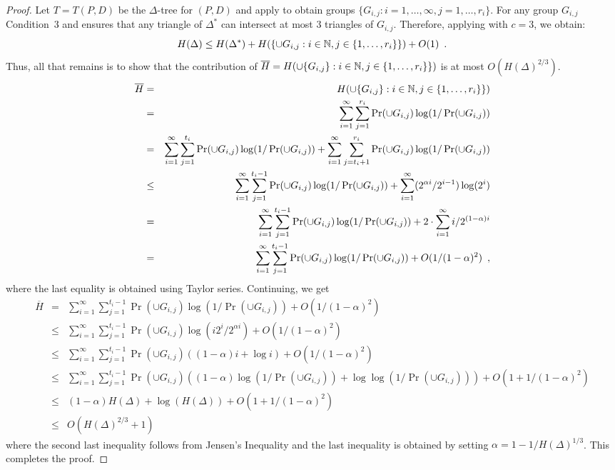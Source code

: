 \documentclass[lotsofwhite]{patmorin}
\begin{document}
\begin{proof}
Let $T=T(P,D)$ be the $\Delta$-tree for $(P,D)$ and apply
 to obtain groups $\{G_{i,j}: i=1,\ldots,\infty,
j=1,\ldots,r_i\}$.  For any group $G_{i,j}$ Condition~3 and
 ensures that any triangle of
$\Delta^*$ can intersect at most 3 triangles of $G_{i,j}$.  Therefore,
applying  with $c=3$, we obtain:
\[ 
 H(\Delta) \le 
   H(\Delta^*) + H(\{{\cup G_{i,j}} : i\in\mathbb{N} , j\in\{1,\ldots,r_i\}\}) 
   + O(1)  \enspace .
\]
Thus, all that remains is to show that the contribution of $\overline
H=H(\cup\{G_{i,j}\} : i\in\mathbb{N} , j\in\{1,\ldots,r_i\}\})$ is at most
$O(H(\Delta)^{2/3})$. 
\begin{eqnarray*}
\overline H 
 & = & H(\cup\{G_{i,j}\} : i\in\mathbb{N} , j\in\{1,\ldots,r_i\}\}) \\
 & = & \sum_{i=1}^\infty
         \sum_{j=1}^{r_i}\Pr(\cup G_{i,j})\log(1/\Pr(\cup G_{i,j})) \\
 & = & \sum_{i=1}^\infty
         \sum_{j=1}^{t_i}\Pr(\cup G_{i,j})\log(1/\Pr(\cup G_{i,j})) 
         + \sum_{i=1}^\infty
         \sum_{j=t_i+1}^{r_i}\Pr(\cup G_{i,j})\log(1/\Pr(\cup G_{i,j})) \\
 & \le & \sum_{i=1}^\infty
         \sum_{j=1}^{t_i-1}\Pr(\cup G_{i,j})\log(1/\Pr(\cup G_{i,j})) 
         + \sum_{i=1}^{\infty} (2^{\alpha i}/ 2^{i-1})\log(2^i) \\
 &  =  & \sum_{i=1}^\infty
         \sum_{j=1}^{t_i-1}\Pr(\cup G_{i,j})\log(1/\Pr(\cup G_{i,j})) 
         + 2\cdot\sum_{i=1}^{\infty} i/2^{(1-\alpha)i} \\
 &  =  & \sum_{i=1}^\infty
         \sum_{j=1}^{t_i-1}\Pr(\cup G_{i,j})\log(1/\Pr(\cup G_{i,j}))
         + O(1/(1-\alpha)^2) \enspace ,
\end{eqnarray*}
where the last equality is obtained using Taylor series.
Continuing, we get 
\begin{eqnarray*}
\overline H
 &  =  & \sum_{i=1}^\infty
         \sum_{j=1}^{t_i-1}\Pr(\cup G_{i,j})\log(1/\Pr(\cup G_{i,j}))
         + O(1/(1-\alpha)^2) \\
 & \le  & \sum_{i=1}^\infty
         \sum_{j=1}^{t_i-1} \Pr(\cup G_{i,j})
              \log(i2^{i}/2^{\alpha i})
         + O(1/(1-\alpha)^2) \\
 & \le  & \sum_{i=1}^\infty
         \sum_{j=1}^{t_i-1} \Pr(\cup G_{i,j})((1-\alpha)i+\log i)
         + O(1/(1-\alpha)^2) \\
 & \le  & \sum_{i=1}^\infty
         \sum_{j=1}^{t_i-1} \Pr(\cup G_{i,j})((1-\alpha)\log(1/\Pr(\cup G_{i,j})) + \log\log(1/\Pr(\cup G_{i,j})))
         + O(1 + 1/(1-\alpha)^2) \\
 & \le &  (1-\alpha)H(\Delta) + \log(H(\Delta)) + O(1 + 1/(1-\alpha)^2) \\
 & \le &  O(H(\Delta)^{2/3}+ 1)
\end{eqnarray*} 
where the second last inequality follows from Jensen's Inequality and the
last inequality is obtained by setting $\alpha=1-1/H(\Delta)^{1/3}$.
This completes the proof.
\end{proof}
\end{document}
